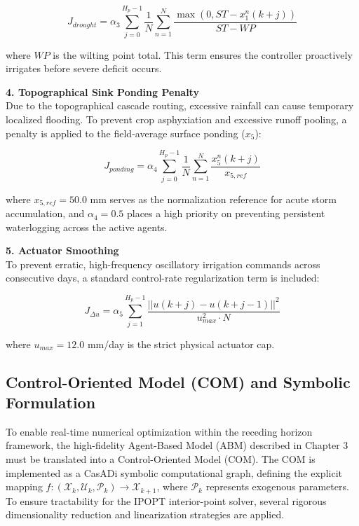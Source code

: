 \documentclass[11pt, a4paper]{article}
\begin{document}
\begin{equation}
    J_{drought} = \alpha_3 \sum_{j=0}^{H_p-1} \frac{1}{N} \sum_{n=1}^{N} \frac{\max(0, ST - x_1^n(k+j))}{ST - WP}
\end{equation}

where $WP$ is the wilting point total. This term ensures the controller proactively irrigates before severe deficit occurs.

\textbf{4. Topographical Sink Ponding Penalty} \\
Due to the topographical cascade routing, excessive rainfall can cause temporary localized flooding. To prevent crop asphyxiation and excessive runoff pooling, a penalty is applied to the field-average surface ponding ($x_5$):

\begin{equation}
    J_{ponding} = \alpha_4 \sum_{j=0}^{H_p-1} \frac{1}{N} \sum_{n=1}^{N} \frac{x_5^n(k+j)}{x_{5,ref}}
\end{equation}

where $x_{5,ref} = 50.0$ mm serves as the normalization reference for acute storm accumulation, and $\alpha_4 = 0.5$ places a high priority on preventing persistent waterlogging across the active agents.

\textbf{5. Actuator Smoothing} \\
To prevent erratic, high-frequency oscillatory irrigation commands across consecutive days, a standard control-rate regularization term is included:

\begin{equation}
    J_{\Delta u} = \alpha_5 \sum_{j=1}^{H_p-1} \frac{||u(k+j) - u(k+j-1)||^2}{u_{max}^2 \cdot N}
\end{equation}

where $u_{max} = 12.0$ mm/day is the strict physical actuator cap.

\subsection{Control-Oriented Model (COM) and Symbolic Formulation}

To enable real-time numerical optimization within the receding horizon framework, the high-fidelity Agent-Based Model (ABM) described in Chapter 3 must be translated into a Control-Oriented Model (COM). The COM is implemented as a CasADi symbolic computational graph, defining the explicit mapping $f: (\mathcal{X}_k, \mathcal{U}_k, \mathcal{P}_k) \to \mathcal{X}_{k+1}$, where $\mathcal{P}_k$ represents exogenous parameters. To ensure tractability for the IPOPT interior-point solver, several rigorous dimensionality reduction and linearization strategies are applied.
\end{document}
